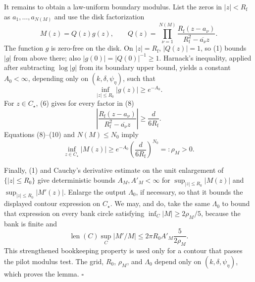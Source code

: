 It remains to obtain a law-uniform boundary modulus. List the zeros in \(|z|<R_{\mathrm f}\) as \(a_1,\ldots,a_{N(M)}\) and use the disk factorization
\[
 M(z)=Q(z)g(z),\qquad
 Q(z)=\prod_{\nu=1}^{N(M)}
 \frac{R_{\mathrm f}(z-a_\nu)}
 {R_{\mathrm f}^2-\overline{a_\nu}z}. \tag{8}
\]
The function \(g\) is zero-free on the disk. On \(|z|=R_{\mathrm f}\), \(|Q(z)|=1\), so (1) bounds \(|g|\) from above there; also \(|g(0)|=|Q(0)|^{-1}\ge1\). Harnack's inequality, applied after subtracting \(\log|g|\) from its boundary upper bound, yields a constant \(A_0<\infty\), depending only on \((k,\delta,\psi_\eta)\), such that
\[
 \inf_{|z|\le R_0}|g(z)|\ge e^{-A_0}. \tag{9}
\]
For \(z\in C_\star\), (6) gives for every factor in (8)
\[
 \left|\frac{R_{\mathrm f}(z-a_\nu)}
 {R_{\mathrm f}^2-\overline{a_\nu}z}\right|
 \ge \frac{d}{6R_{\mathrm f}}. \tag{10}
\]
Equations (8)--(10) and \(N(M)\le N_0\) imply
\[
 \inf_{z\in C_\star}|M(z)|
 \ge e^{-A_0}\left(\frac{d}{6R_{\mathrm f}}\right)^{N_0}
 =:\rho_M>0. \tag{11}
\]

Finally, (1) and Cauchy's derivative estimate on the unit enlargement of \(\{|z|\le R_0\}\) give deterministic bounds \(A_M,A'_M<\infty\) for \(\sup_{|z|\le R_0}|M(z)|\) and \(\sup_{|z|\le R_0}|M'(z)|\). Enlarge the output \(\Lambda_0\), if necessary, so that it bounds the displayed contour expression on \(C_\star\). We may, and do, take the same \(\Lambda_0\) to bound that expression on every bank circle satisfying \(\inf_C|M|\ge2\rho_M/5\), because the bank is finite and
\[
 \operatorname{len}(C)\sup_C|M'/M|
 \le 2\pi R_0 A'_M\frac{5}{2\rho_M}. \tag{12}
\]
This strengthened bookkeeping property is used only for a contour that passes the pilot modulus test. The grid, \(R_0\), \(\rho_M\), and \(\Lambda_0\) depend only on \((k,\delta,\psi_\eta)\), which proves the lemma. \(\square\)